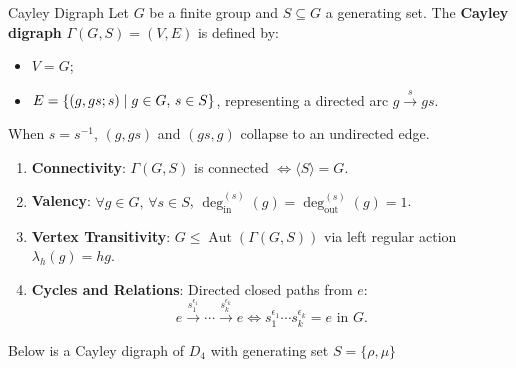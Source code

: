 \documentclass[12pt,a4paper]{article}
\begin{document}
    \begin{defi}{Cayley Digraph}
        Let $G$ be a finite group and $S \subseteq G$ a generating set. The \textbf{Cayley digraph} $\Gamma(G, S) = (V, E)$ is defined by:
        \begin{itemize}
            \item $V = G$;
            \item $E = \left\{ (g, gs; s) \mid g \in G, \, s \in S \right\}$, representing a directed arc $g \xrightarrow{s} gs$.
        \end{itemize}
        When $s = s^{-1}$, $(g, gs)$ and $(gs, g)$ collapse to an undirected edge.
    \end{defi}
    \bigskip
    
    \begin{prop}
        \begin{enumerate}
            \item \textbf{Connectivity}: $\Gamma(G, S)$ is connected $\iff \langle S \rangle = G$.
            \item \textbf{Valency}: $\forall g \in G, \, \forall s \in S$, $\deg_{\text{in}}^{(s)}(g) = \deg_{\text{out}}^{(s)}(g) = 1$.
            \item \textbf{Vertex Transitivity}: $G \le \operatorname{Aut}(\Gamma(G, S))$ via left regular action $\lambda_h(g) = hg$.
            \item \textbf{Cycles and Relations}: Directed closed paths from $e$:
            \[
                e \xrightarrow{s_1^{\epsilon_1}} \cdots \xrightarrow{s_k^{\epsilon_k}} e \iff s_1^{\epsilon_1} \cdots s_k^{\epsilon_k} = e \text{ in } G.
            \]
        \end{enumerate}
    \end{prop}
    \bigskip
    
    \begin{eg}
        Below is a Cayley digraph of $D_4$ with generating set $S = \{\rho, \mu\}$
    \end{eg}
\end{document}
